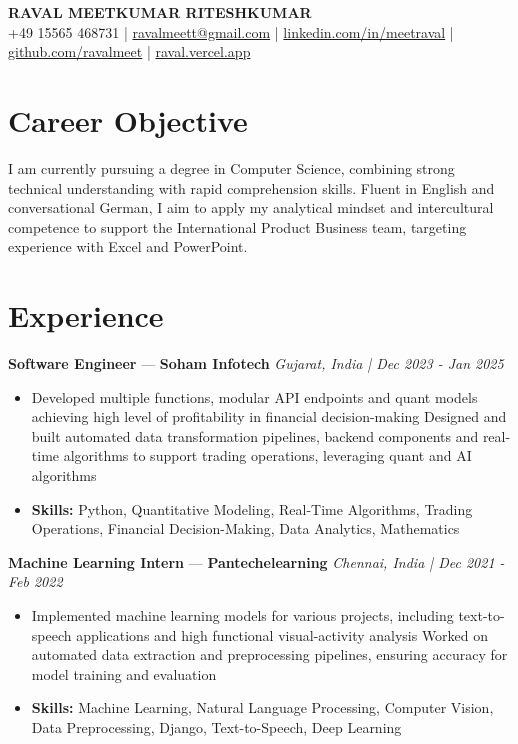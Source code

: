 \documentclass[a4paper,10pt]{article}
\begin{document}
\begin{center}
  {\Large\bfseries RAVAL MEETKUMAR RITESHKUMAR}\\[2pt]
  {\small +49 15565 468731 \;|\; \href{mailto:ravalmeett@gmail.com}{ravalmeett@gmail.com} \;|\; \href{https://www.linkedin.com/in/meetraval/}{linkedin.com/in/meetraval} \;|\; \href{https://github.com/ravalmeet}{github.com/ravalmeet} \;|\; \href{https://raval.vercel.app/}{raval.vercel.app}}
\end{center}
\vspace{-3pt}

\section*{Career Objective}
I am currently pursuing a degree in Computer Science, combining strong technical understanding with rapid comprehension skills. Fluent in English and conversational German, I aim to apply my analytical mindset and intercultural competence to support the International Product Business team, targeting experience with Excel and PowerPoint.\par

\section*{Experience}
\textbf{Software Engineer} — \textbf{Soham Infotech} \hfill \textit{Gujarat, India \;|\; Dec 2023 - Jan 2025}\par
\vspace{1pt}
\begin{itemize}
  \item Developed multiple functions, modular API endpoints and quant models achieving high level of profitability in financial decision-making Designed and built automated data transformation pipelines, backend components and real-time algorithms to support trading operations, leveraging quant and AI algorithms
  \item \textbf{Skills:} Python, Quantitative Modeling, Real-Time Algorithms, Trading Operations, Financial Decision-Making, Data Analytics, Mathematics
\end{itemize}
\vspace{3pt}
\textbf{Machine Learning Intern} — \textbf{Pantechelearning} \hfill \textit{Chennai, India \;|\; Dec 2021 - Feb 2022}\par
\vspace{1pt}
\begin{itemize}
  \item Implemented machine learning models for various projects, including text-to-speech applications and high functional visual-activity analysis Worked on automated data extraction and preprocessing pipelines, ensuring accuracy for model training and evaluation
  \item \textbf{Skills:} Machine Learning, Natural Language Processing, Computer Vision, Data Preprocessing, Django, Text-to-Speech, Deep Learning
\end{itemize}
\end{document}
